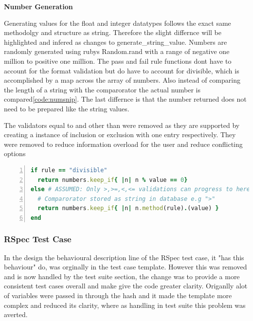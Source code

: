 \documentclass[a4paper,12pt]{article}
\begin{document}
\par \textbf{Number Generation}
\par Generating values for the float and integer datatypes follows the exact same methodolgy and structure as string. Therefore the slight differnce will be highlighted and infered as changes to generate\_string\_value. Numbers are randomly generated using rubys Random.rand with a range of negative one million to positive one million. The pass and fail rule functions dont have to account for the format validation but do have to account for divisible, which is accomplished by a map across the array of numbers. Also instead of comparing the length of a string with the comparorator the actual number is compared\ref{code:numsnip}. The last differnce is that the number returned does not need to be prepared like the string values.
\par The validators equal to and other than were removed as they are supported by creating a instance of inclusion or exclusion with one entry respectively. They were removed to reduce information overload for the user and reduce conflicting options

\begin{lstlisting}[frame=single,numbers=left,language = ruby,caption= {Differnce in pass/fail num rule to string pass/fail}, label={code:numsnip}]
if rule == "divisible"
  return numbers.keep_if{ |n| n % value == 0}
else # ASSUMED: Only >,>=,<,<= validations can progress to here
  # Comparorator stored as string in database e.g ">"
  return numbers.keep_if{ |n| n.method(rule).(value) }
end
\end{lstlisting}
\subsubsection{RSpec Test Case}

\par  In the design the behavioural description line of the RSpec test case, it "has this behaviour" do, was orginally in the test case template. However this was removed and is now handled by the test suite section, the change was to provide a more consistent test cases overall and make give the code greater clarity. Origanlly alot of variables were passed in through the hash and it made the template more complex and reduced its clarity, where as handling in test suite this problem was averted.
\end{document}
